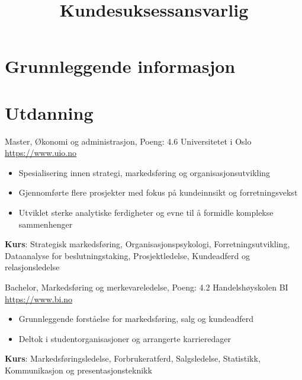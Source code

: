 \documentclass[a4paper, serif, 10pt]{moderncv}
\title{Kundesuksessansvarlig}
\begin{document}
\maketitle

\section{Grunnleggende informasjon}

\section{Utdanning}

        {Master, Økonomi og administrasjon, Poeng: 4.6}
        {Universitetet i Oslo}
        {\url{https://www.uio.no}}
        {}
        {\begin{itemize}
\item Spesialisering innen strategi, markedsføring og organisasjonsutvikling
\item Gjennomførte flere prosjekter med fokus på kundeinnsikt og forretningsvekst
\item Utviklet sterke analytiske ferdigheter og evne til å formidle komplekse sammenhenger
\end{itemize}
\textbf{Kurs}: Strategisk markedsføring, Organisasjonspsykologi, Forretningsutvikling, Dataanalyse for beslutningstaking, Prosjektledelse, Kundeadferd og relasjonsledelse}

        {Bachelor, Markedsføring og merkevareledelse, Poeng: 4.2}
        {Handelshøyskolen BI}
        {\url{https://www.bi.no}}
        {}
        {\begin{itemize}
\item Grunnleggende forståelse for markedsføring, salg og kundeadferd
\item Deltok i studentorganisasjoner og arrangerte karrieredager
\end{itemize}
\textbf{Kurs}: Markedsføringsledelse, Forbrukeratferd, Salgsledelse, Statistikk, Kommunikasjon og presentasjonsteknikk}
\end{document}

